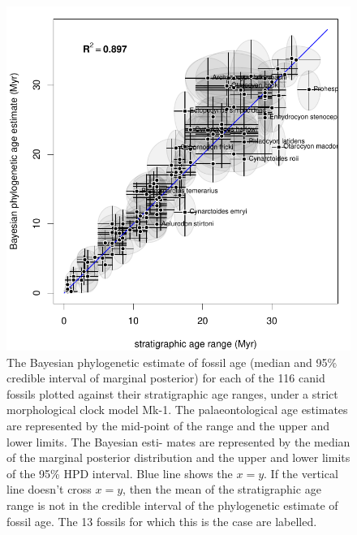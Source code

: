 \documentclass[11pt]{article}
\newcommand{\Mstrict}{{Mk-1}}
\newcommand{\ncanidfossils}{{116}}
\begin{document}
\begin{figure}
\includegraphics{canids/stratRanges/1c_phyloAgeVsGeoAge.pdf}
\caption{\label{fig:canidMorphVsGeo}
The Bayesian phylogenetic estimate of fossil age (median and 95\% credible interval of marginal posterior) for each of the \ncanidfossils{} canid fossils plotted against their stratigraphic age ranges, under a strict morphological clock model \Mstrict{}. 
The palaeontological age estimates are represented by the mid-point of the range and the upper and lower limits. The Bayesian esti- mates are represented by the median of the marginal posterior distribution and the upper and lower limits of the 95\% HPD interval.
Blue line shows the $x=y$. 
If the vertical line doesn't cross $x=y$, then the mean of the stratigraphic age range is not in the credible interval of the phylogenetic estimate of fossil age. The 13 fossils for which this is the case are labelled.}
\end{figure}
\end{document}
